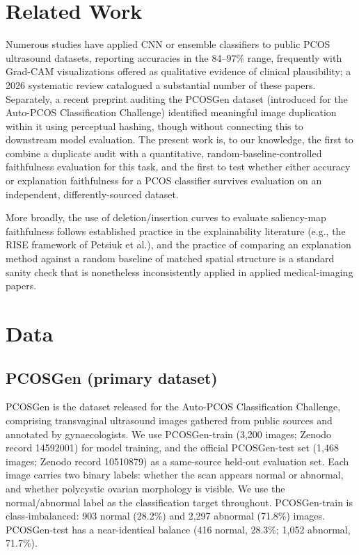 \documentclass[conference]{IEEEtran}
\begin{document}
\section{Related Work}

Numerous studies have applied CNN or ensemble classifiers to public PCOS ultrasound datasets, reporting accuracies in the 84--97\% range, frequently with Grad-CAM visualizations offered as qualitative evidence of clinical plausibility; a 2026 systematic review catalogued a substantial number of these papers. Separately, a recent preprint auditing the PCOSGen dataset (introduced for the Auto-PCOS Classification Challenge) identified meaningful image duplication within it using perceptual hashing, though without connecting this to downstream model evaluation. The present work is, to our knowledge, the first to combine a duplicate audit with a quantitative, random-baseline-controlled faithfulness evaluation for this task, and the first to test whether either accuracy or explanation faithfulness for a PCOS classifier survives evaluation on an independent, differently-sourced dataset.

More broadly, the use of deletion/insertion curves to evaluate saliency-map faithfulness follows established practice in the explainability literature (e.g., the RISE framework of Petsiuk et al.), and the practice of comparing an explanation method against a random baseline of matched spatial structure is a standard sanity check that is nonetheless inconsistently applied in applied medical-imaging papers.

\section{Data}

\subsection{PCOSGen (primary dataset)}

PCOSGen is the dataset released for the Auto-PCOS Classification Challenge, comprising transvaginal ultrasound images gathered from public sources and annotated by gynaecologists. We use PCOSGen-train (3,200 images; Zenodo record 14592001) for model training, and the official PCOSGen-test set (1,468 images; Zenodo record 10510879) as a same-source held-out evaluation set. Each image carries two binary labels: whether the scan appears normal or abnormal, and whether polycystic ovarian morphology is visible. We use the normal/abnormal label as the classification target throughout. PCOSGen-train is class-imbalanced: 903 normal (28.2\%) and 2,297 abnormal (71.8\%) images. PCOSGen-test has a near-identical balance (416 normal, 28.3\%; 1,052 abnormal, 71.7\%).
\end{document}
